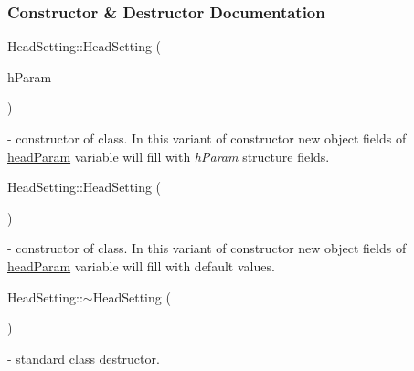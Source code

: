 \subsubsection{Constructor \& Destructor Documentation}
\mbox{\label{classHeadSetting_a917fa6a3f5a948babf7a4ac2da7ba665}} 
{\footnotesize\ttfamily Head\+Setting\+::\+\texorpdfstring{Head\+Setting}{HeadSetting}{\footnotesize\ttfamily [1/2]} (\begin{DoxyParamCaption}\item[{\mbox{\hyperlink{classHeadSetting_ab604bc48df56fc11dd649357ae7b45b8}{Head\+Parameters}}}]{h\+Param }\end{DoxyParamCaption})} - constructor of class. In this variant of constructor new object fields of \hyperlink{classHeadSetting_a842397f02022fd1d4217afb65beac990}{head\+Param} variable will fill with \textit{h\+Param} structure fields.

\mbox{\label{classHeadSetting_af36d589b132ae92d8288a0e896d5cfd5}} 
{\footnotesize\ttfamily Head\+Setting\+::\+\texorpdfstring{Head\+Setting}{HeadSetting}{\footnotesize\ttfamily [2/2]} (\begin{DoxyParamCaption}{ }\end{DoxyParamCaption})} - constructor of class. In this variant of constructor new object fields of \hyperlink{classHeadSetting_a842397f02022fd1d4217afb65beac990}{head\+Param} variable will fill with default values.

\mbox{\label{classHeadSetting_a0330e2d60a22fda9da5e85ce6a804ee3}} 
{\footnotesize\ttfamily Head\+Setting\+::\texorpdfstring{$\sim$\+Head\+Setting}{~HeadSetting} (\begin{DoxyParamCaption}{ }\end{DoxyParamCaption})} - standard class destructor.



